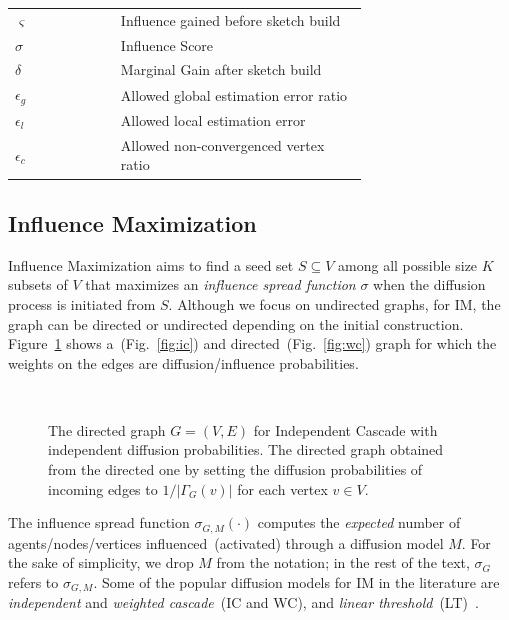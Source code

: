 \documentclass[10pt,journal,compsoc]{IEEEtran}
\begin{document}
\begin{table}[!ht]
\begin{tabular}{|l|p{0.7\linewidth}|}
        $\varsigma $    & Influence gained before sketch build\\
        $\sigma $       & Influence Score\\
        $\delta$        & Marginal Gain after sketch build\\
        $\epsilon_g$    & Allowed global estimation error ratio\\
        $\epsilon_l$    & Allowed local estimation error\\ 
        $\epsilon_c$    & Allowed non-convergenced vertex ratio\\
        \hline         
    \end{tabular}
\end{table}
\subsection{Influence Maximization}

Influence Maximization aims to find a seed set $S \subseteq V$ among all possible size $K$ subsets of $V$ that maximizes an {\em influence spread function} $\sigma$  when the diffusion process is initiated from $S$. Although we focus on undirected graphs, for IM, the graph can be directed or undirected depending on the initial construction. Figure~\ref{fig:xx} shows a~(Fig.~\ref{fig:ic}) and directed~(Fig.~\ref{fig:wc})
graph for which the weights on the edges are diffusion/influence probabilities. 

\begin{figure}[!ht] 
    \centering
    \\%
  \caption{\protect{} 
The directed graph $G = (V, E)$ for Independent Cascade with independent diffusion probabilities. 
\protect{}
The directed graph obtained from the directed one by setting the diffusion probabilities of incoming edges to $1 / |\Gamma_G(v)|$ for each vertex $v \in V$. 
  }
  \label{fig:xx} 
\end{figure}
The influence spread function $\sigma_{G,M}(\cdot)$ computes the {\em expected} number of agents/nodes/vertices influenced~(activated) through a diffusion model $M$. For the sake of simplicity, we drop $M$ from the notation; in the rest of the text, $\sigma_{G}$ refers to $\sigma_{G,M}$. Some of the popular diffusion models for IM in the literature are {\em independent} and {\em weighted cascade}~(IC and WC),  and {\em linear threshold}~(LT)~\cite{kempe2003maximizing}. 
\end{document}

